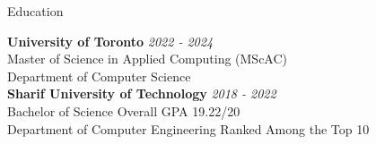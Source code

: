 \documentclass{resume} %
\begin{document}

\begin{rSection}{Education}

{\bf University of Toronto} \hfill \textcolor{Black!70}{\em 2022 - 2024} 
\\ Master of Science in Applied Computing (MScAC)
\\ Department of Computer Science
\\

{\bf Sharif University of Technology} \hfill \textcolor{Black!70}{\em 2018 - 2022} 
\\ Bachelor of Science \hfill \textcolor{Black!70}{ Overall GPA 19.22/20}
\\ Department of Computer Engineering \hfill \textcolor{Black!70}{Ranked Among the Top 10}
\\



\end{rSection}
\end{document}
